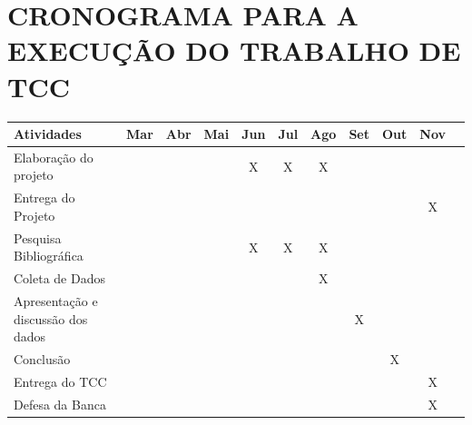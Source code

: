 \documentclass[brazil, ruledheader, pnumromarab,normaltoc]{abnt}
\begin{document}
\chapter{CRONOGRAMA PARA A EXECUÇÃO DO TRABALHO DE TCC}
\begin{tabular}{|p{4cm}|c|c|c|c|c|c|c|c|c|c|}
\hline
\textbf{Atividades}&		\textbf{Mar}&	\textbf{Abr}&		\textbf{Mai}&		\textbf{Jun}&		\textbf{Jul}&		\textbf{Ago}&	\textbf{Set}&		\textbf{Out}&	\textbf{Nov}\\
\hline
Elaboração do projeto&	&	&	&	X&	X&	X&	&	&	\\
\hline
Entrega do Projeto&		&	&	&	&	&	&	&	&	X\\
\hline
Pesquisa Bibliográfica&	&	&	&	X&	X&	X&	&		&\\
\hline
Coleta de Dados&		&	&	&	&	&	X&	&		&\\
\hline
Apresentação e discussão dos dados&	&	&	&	&	&	&	X&	&\\
\hline
Conclusão&	&	&	&	&	&	&	&	X&	\\
\hline
Entrega do TCC&	&	&	&	&	&	&	&	&	X\\
\hline
Defesa da Banca&	&	&	&	&	&	&	&	&	X\\
\hline
\end{tabular}



\end{document}
